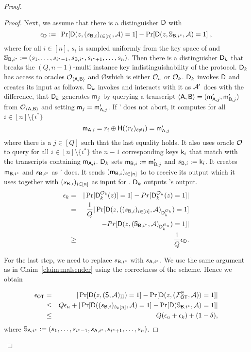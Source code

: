 \begin{proof}
\begin{proof}
Next, we assume that there is a distinguisher $\mathsf D$ with
$$
\epsilon_{\mathsf D}:=|\Pr[\mathsf D(z,(s_{\mathsf{B},i})_{i\in[n]},\mathcal{A})=1] -\Pr[\mathsf D(z,\mathsf{\mathbb S}_{\mathsf{B},i^*}, \mathcal{A})=1]|,
$$
where for all $i\in[n]$, $s_i$ is sampled uniformly from the key space of \UKA and $\mathsf{\mathbb S}_{\mathsf{B},i^*}:=(s_{1},\dots, s_{i^*-1},s_{\mathsf{B},i^*},s_{i^*+1},\dots, s_{n})$. Then there is a distinguisher $\mathsf D_k$ that breaks the $(Q,n-1)$-multi instance key indistinguishability of the \UKA protocol. $\mathsf D_k$ has access to oracles $\mathcal{O}_{\langle \mathsf{A},\mathsf{B}\rangle}$ and \O which is either $\mathcal{O}_u$ or $\mathcal{O}_k$. $\mathsf D_k$ invokes $\mathsf D$ and creates its input as follows. $\mathsf D_k$ invokes \Adv and interacts with it as $\mathcal{A}'$ does with the difference, that $\mathsf D_k$ generates $\mathsf{m}_j$ by querying a transcript $\langle \mathsf{A}, \mathsf{B}\rangle=(\mathsf{m}_{\mathsf{A},j}',\mathsf{m}_{\mathsf{B},j}')$ from $\mathcal{O}_{\langle \mathsf{A},\mathsf{B}\rangle}$ and setting $\mathsf{m}_j=\mathsf{m}_{\mathsf{A},j}'$. If \Adv' does not abort, it computes for all $i\in[n]\setminus\{i^*\}$
$$
\mathsf{m}_{\mathsf{A},i}=r_i\oplus\mathsf{H}((r_{\ell})_{\ell\neq i})=\mathsf{m}_{\mathsf{A},j}'
$$
where there is a $j\in[Q]$ such that the last equality holds. It also uses oracle $\mathcal{O}$ to query for all $i\in[n]\setminus\{i^*\}$ the $n-1$ corresponding keys $\mathsf{k}_i$ that match with the transcripts containing $\mathsf{m}_{\mathsf{A},i}$. $\mathsf D_k$ sets $\mathsf{m}_{\mathsf{B},i}:=\mathsf{m}_{\mathsf{B},j}'$ and $s_{\mathsf{B},i}:=\mathsf{k}_i$. It creates $\mathsf{m}_{\mathsf{B},i^*}$ and $s_{\mathsf{B},i^*}$ as \Adv' does. It sends $(\mathsf{m}_{\mathsf{B},i})_{i\in[n]}$ to \Adv to receive its output which it uses together with $(s_{\mathsf{B},i})_{i\in[n]}$ as input for \D. $\mathsf D_k$ outputs \D's output.  
\begin{eqnarray*}
\epsilon_{k}&=&|\Pr[\mathsf D_k^{\mathcal{O}_{k}}(z)]=1]-Pr[\mathsf D_k^{\mathcal{O}_{u}}(z)=1]|\\
&= &\frac{1}{Q}|\Pr[\mathsf D(z,((s_{\mathsf{B},i})_{i\in[n]},\mathcal{A})_{\mathsf D_k^{\mathcal{O}_{k}}})=1]\\
&&-Pr[\mathsf D(z,(\mathsf{\mathbb S}_{\mathsf{B},i^*},\mathcal{A})_{\mathsf D_k^{\mathcal{O}_{u}}})=1]|\\
&\geq&\frac{1}{Q}\epsilon_{\mathsf D}.
\end{eqnarray*}

For the last step, we need to replace $s_{\mathsf{B},i^*}$ with $s_{\mathsf{A},i^*}$. We use the same argument as in Claim~\ref{claim:malsender} using the correctness of the scheme. Hence we obtain

\begin{eqnarray*}
\epsilon_{\mathsf{OT}} &=&|\Pr[\mathsf D(z,(\mathsf{S}, \mathcal{A})_{\Pi})=1] -\Pr[\mathsf D(z,(\mathcal{F}_{\mathsf{OT}}^\mathsf{E},\mathcal{A}))=1]|\\
&\leq & Q\epsilon_{u}+|\Pr[\mathsf D((s_{\mathsf{B},i})_{i\in[n]},\mathcal{A})=1]-\Pr[\mathsf D(\mathsf{\mathbb S}_{\mathsf{B},i^*}, \mathcal{A})=1]|\\
&\leq &Q(\epsilon_{u}+\epsilon_{k})+(1-\delta),
\end{eqnarray*}
where $\mathsf{\mathbb S}_{\mathsf{A},i^*}:=(s_{1},\dots, s_{i^*-1},s_{\mathsf{A},i^*},s_{i^*+1},\dots, s_{n})$.
\pe
\end{proof}
\pe
\end{proof}

